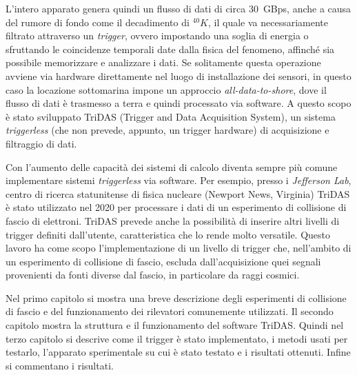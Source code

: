 \documentclass[../main.tex]{subfiles}
\begin{document}
L'intero apparato genera quindi un flusso di dati di circa \SI{30}{GBps}, anche a causa del rumore di fondo come il decadimento di ${}^{40}K$, il quale va necessariamente filtrato attraverso un \emph{trigger}, ovvero impostando una soglia di energia o sfruttando le coincidenze temporali date dalla fisica del fenomeno, affinché sia possibile memorizzare e analizzare i dati. Se solitamente questa operazione avviene via hardware direttamente nel luogo di installazione dei sensori, in questo caso la locazione sottomarina impone un approccio \emph{all-data-to-shore}, dove il flusso di dati è trasmesso a terra e quindi processato via software. A questo scopo è stato sviluppato TriDAS (Trigger and Data Acquisition System), un sistema \emph{triggerless} (che non prevede, appunto, un trigger hardware) di acquisizione e filtraggio di dati.

Con l'aumento delle capacità dei sistemi di calcolo diventa sempre più comune implementare sistemi \emph{triggerless} via software. Per esempio, presso i \emph{Jefferson Lab}, centro di ricerca statunitense di fisica nucleare (Newport News, Virginia) TriDAS è stato utilizzato nel 2020 per processare i dati di un esperimento di collisione di fascio di elettroni. TriDAS prevede anche la possibilità di inserire altri livelli di trigger definiti dall'utente, caratteristica che lo rende molto versatile. Questo lavoro ha come scopo l'implementazione di un livello di trigger che, nell'ambito di un esperimento di collisione di fascio, escluda dall'acquisizione quei segnali provenienti da fonti diverse dal fascio, in particolare da raggi cosmici.


Nel primo capitolo si mostra una breve descrizione degli esperimenti di collisione di fascio e del funzionamento dei rilevatori comunemente utilizzati.
Il secondo capitolo mostra la struttura e il funzionamento del software TriDAS.
Quindi nel terzo capitolo si descrive come il trigger è stato implementato, i metodi usati per testarlo, l'apparato sperimentale su cui è stato testato e i risultati ottenuti.
Infine si commentano i risultati.
\end{document}
